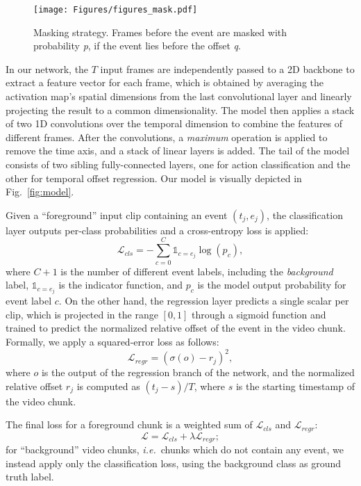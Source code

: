 \documentclass[a4paper,conference]{IEEEtran}
\def \ie {\emph{i.e.}}
\begin{document}
\label{sub:masking}
\begin{figure}[t]
\centering
\texttt{[image: Figures/figures\_mask.pdf]}
\caption{Masking strategy. Frames before the event are masked with probability \textit{p}, if the event lies before the offset \textit{q}.}
\label{fig:masking}
\end{figure}



In our network, the $T$ input frames are independently passed to a 2D backbone to extract a feature vector for each frame, which is obtained by averaging the activation map's spatial dimensions from the last convolutional layer and linearly projecting the result to a common dimensionality. The model then applies a stack of two 1D convolutions over the temporal dimension to combine the features of different frames. After the convolutions, a \textit{maximum} operation is applied to remove the time axis, and a stack of linear layers is added. The tail of the model consists of two sibling fully-connected layers, one for action classification and the other for temporal offset regression. 
Our model is visually depicted in Fig.~\ref{fig:model}. 


Given a ``foreground'' input clip containing an event $(t_j, e_j)$, the classification layer outputs per-class probabilities and a cross-entropy loss is applied:
\begin{equation}
\label{eq:xe}
\mathcal{L}_{cls} = -\sum_{c=0}^{C}\mathds{1}_{c = e_j} \log(p_{c}),
\end{equation}
where $C+1$ is the number of different event labels, including the \textit{background} label, $\mathds{1}_{c = e_j}$ is the indicator function, and $p_{c}$ is the model output probability for event label $c$.
On the other hand, the regression layer predicts a single scalar per clip, which is projected in the range $[0, 1]$ through a sigmoid function and trained to predict the normalized relative offset of the event in the video chunk. Formally, we apply a squared-error loss as follows:
\begin{equation}
\label{eq:mse}
\mathcal{L}_{regr} = (\sigma(o) - r_j)^2,
\end{equation}
where $o$ is the output of the regression branch of the network, and the normalized relative offset $r_j$ is computed as $(t_j - s)/T$, where $s$ is the starting timestamp of the video chunk.

The final loss for a foreground chunk is a weighted sum of $\mathcal{L}_{cls}$ and $\mathcal{L}_{regr}$:
\begin{equation}
\label{eq:loss}
\mathcal{L} = \mathcal{L}_{cls} + \lambda\mathcal{L}_{regr};
\end{equation}
for ``background'' video chunks, \ie~chunks which do not contain any event, we instead apply only the classification loss, using the background class as ground truth label.
\end{document}
